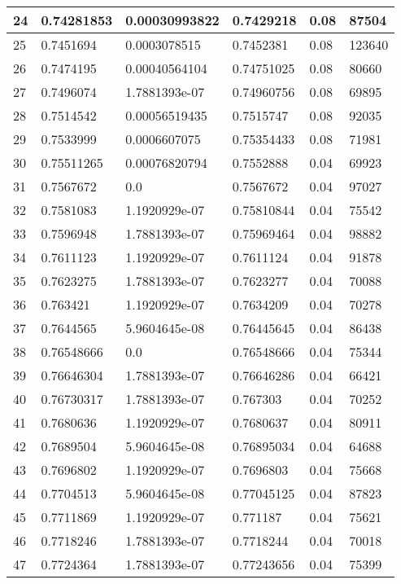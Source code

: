 \begin{longtable}{|l|l|l|l|l|l|}
24 & 0.74281853 & 0.00030993822 & 0.7429218 & 0.08 & 87504 \\ \hline 
25 & 0.7451694 & 0.0003078515 & 0.7452381 & 0.08 & 123640 \\ \hline 
26 & 0.7474195 & 0.00040564104 & 0.74751025 & 0.08 & 80660 \\ \hline 
27 & 0.7496074 & 1.7881393e-07 & 0.74960756 & 0.08 & 69895 \\ \hline 
28 & 0.7514542 & 0.00056519435 & 0.7515747 & 0.08 & 92035 \\ \hline 
29 & 0.7533999 & 0.0006607075 & 0.75354433 & 0.08 & 71981 \\ \hline 
30 & 0.75511265 & 0.00076820794 & 0.7552888 & 0.04 & 69923 \\ \hline 
31 & 0.7567672 & 0.0 & 0.7567672 & 0.04 & 97027 \\ \hline 
32 & 0.7581083 & 1.1920929e-07 & 0.75810844 & 0.04 & 75542 \\ \hline 
33 & 0.7596948 & 1.7881393e-07 & 0.75969464 & 0.04 & 98882 \\ \hline 
34 & 0.7611123 & 1.1920929e-07 & 0.7611124 & 0.04 & 91878 \\ \hline 
35 & 0.7623275 & 1.7881393e-07 & 0.7623277 & 0.04 & 70088 \\ \hline 
36 & 0.763421 & 1.1920929e-07 & 0.7634209 & 0.04 & 70278 \\ \hline 
37 & 0.7644565 & 5.9604645e-08 & 0.76445645 & 0.04 & 86438 \\ \hline 
38 & 0.76548666 & 0.0 & 0.76548666 & 0.04 & 75344 \\ \hline 
39 & 0.76646304 & 1.7881393e-07 & 0.76646286 & 0.04 & 66421 \\ \hline 
40 & 0.76730317 & 1.7881393e-07 & 0.767303 & 0.04 & 70252 \\ \hline 
41 & 0.7680636 & 1.1920929e-07 & 0.7680637 & 0.04 & 80911 \\ \hline 
42 & 0.7689504 & 5.9604645e-08 & 0.76895034 & 0.04 & 64688 \\ \hline 
43 & 0.7696802 & 1.1920929e-07 & 0.7696803 & 0.04 & 75668 \\ \hline 
44 & 0.7704513 & 5.9604645e-08 & 0.77045125 & 0.04 & 87823 \\ \hline 
45 & 0.7711869 & 1.1920929e-07 & 0.771187 & 0.04 & 75621 \\ \hline 
46 & 0.7718246 & 1.7881393e-07 & 0.7718244 & 0.04 & 70018 \\ \hline 
47 & 0.7724364 & 1.7881393e-07 & 0.77243656 & 0.04 & 75399 \\ \hline 

\end{longtable}
